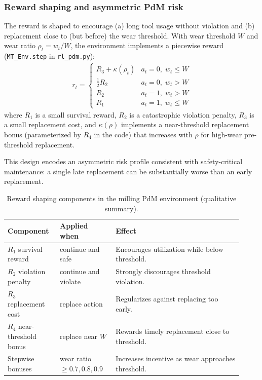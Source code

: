 \documentclass[11pt]{article}
\begin{document}
\subsubsection{Reward shaping and asymmetric PdM risk}
The reward is shaped to encourage (a) long tool usage without violation and (b) replacement close to (but before) the wear threshold. With wear threshold $W$ and wear ratio $\rho_t=w_t/W$, the environment implements a piecewise reward (\texttt{MT\_Env.step} in \texttt{rl\_pdm.py}):
\begin{align}
  r_t =
  \begin{cases}
    R_3 + \kappa(\rho_t) & a_t=0,\; w_t\le W \\
    \tfrac{1}{2}R_2 & a_t=0,\; w_t>W \\
    R_2 & a_t=1,\; w_t>W \\
    R_1 & a_t=1,\; w_t\le W
  \end{cases}
\end{align}
where $R_1$ is a small survival reward, $R_2$ is a catastrophic violation penalty, $R_3$ is a small replacement cost, and $\kappa(\rho)$ implements a near-threshold replacement bonus (parameterized by $R_4$ in the code) that increases with $\rho$ for high-wear pre-threshold replacement.

This design encodes an asymmetric risk profile consistent with safety-critical maintenance: a single late replacement can be substantially worse than an early replacement.

\begin{table}[t]
  \centering
  \caption{Reward shaping components in the milling PdM environment (qualitative summary).}
  \label{tab:reward_components}
  \begin{tabular}{p{0.20\linewidth} p{0.22\linewidth} p{0.50\linewidth}}
    \toprule
    \rowcolor{gray!20} \textbf{Component} & \textbf{Applied when} & \textbf{Effect}\\
    \midrule
    $R_1$ survival reward & continue and safe & Encourages utilization while below threshold.\\
    $R_2$ violation penalty & continue and violate & Strongly discourages threshold violation.\\
    $R_3$ replacement cost & replace action & Regularizes against replacing too early.\\
    $R_4$ near-threshold bonus & replace near $W$ & Rewards timely replacement close to threshold.\\
    Stepwise bonuses & wear ratio \,$\ge 0.7,0.8,0.9$ & Increases incentive as wear approaches threshold.\\
    \bottomrule
  \end{tabular}
\end{table}
\end{document}
